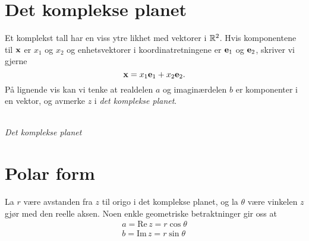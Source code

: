 \section*{Det komplekse planet}

Et komplekst tall har en viss ytre likhet med vektorer i $\mathbb{R}^2$. Hvis komponentene til $\mathbf{x}$ er $x_1$ og $x_2$ og enhetsvektorer i koordinatretningene er $\mathbf{e}_1$ og $\mathbf{e}_2$, skriver vi gjerne
\[
\mathbf{x}=x_1 \mathbf{e}_1+x_2 \mathbf{e}_2.
\]
På lignende vis kan vi tenke at realdelen $a$ og imaginærdelen $b$ er komponenter i en vektor, og avmerke $z$ i \emph{det komplekse planet}.
\begin{center}
\\
{\small \textit{Det komplekse planet}}
\end{center}

\section*{Polar form}
La $r$ være avstanden fra $z$ til origo i det komplekse planet, og la $\theta$ være vinkelen $z$ gjør med den reelle aksen. Noen enkle geometriske betraktninger gir oss at 
\begin{align*}
a=\text{Re}\, z = r\cos \theta \\
b=\text{Im}\, z = r\sin \theta \\
\end{align*}

